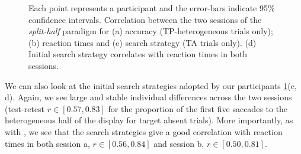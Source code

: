 \documentclass[]{rsos}%
\begin{document}
\begin{figure}
\centering
{}
\caption{Each point represents a participant and the error-bars indicate 95\% confidence intervals. Correlation between the two sessions of the \textit{split-half} paradigm for (a)  accuracy (TP-heterogeneous trials only); (b) reaction times and (c) search strategy (TA trials only). (d) Initial search strategy correlates with reaction times in both sessions. }
\label{fig:splithalf_summary}
\end{figure}

We can also look at the initial search strategies adopted by our participants \ref{fig:splithalf_summary}(c, d). Again, we see large and stable individual differences across the two sessions (test-retest $r \in [0.57, 0.83]$ for the proportion of the first five saccades to the heterogeneous half of the display for target absent trials). More importantly, as with \cite{nowakowsak2017}, we see that the search strategies give a good correlation with reaction times in both session a, $r \in [0.56, 0.84]$ and session b, $r \in [0.50, 0.81]$.
\end{document}
